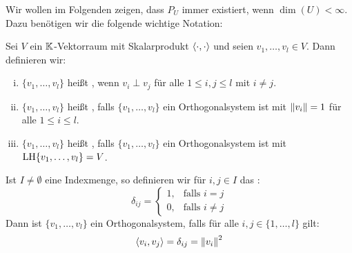 Wir wollen im Folgenden zeigen, dass $P_U$ immer existiert, wenn $\dim(U) < \infty$.
Dazu benötigen wir die folgende wichtige Notation:

\begin{definition}
	\label{def:4.5}
	Sei $V$ ein $\mathbb{K}$-Vektorraum mit Skalarprodukt $\left\langle\cdot,\cdot\right\rangle$ und seien $v_1,\dots,v_l \in V$.
	Dann definieren wir:
	
	\begin{enumerate}[(i)]
		\item $\{v_1,\dots,v_l\}$ heißt , wenn $v_i \perp v_j$ für alle $1 \leq i,j \leq l$ mit $i \neq j$.
		\item $\{v_1,\dots,v_l\}$ heißt , falls $\{v_1,\dots,v_l\}$ ein Orthogonalsystem ist mit $\left\lVert v_i\right\rVert = 1$ für alle $1 \leq i \leq l$.
		\item $\{v_1,\dots,v_l\}$ heißt , falls $\{v_1,\dots,v_l\}$ ein Orthogonalsystem ist mit $\operatorname{LH}\{v_1,\dots,v_l\} = V$.
	\end{enumerate}
\end{definition}

\begin{definition}[Kroneckersymbol]
	\label{def:4.6}
	Ist $I \neq \emptyset$ eine Indexmenge, so definieren wir für $i,j \in I$ das :
	\[
		\delta_{ij} = \begin{cases}
			1, & \text{falls } i = j \\
			0, & \text{falls } i \neq j
		\end{cases}
	\]
	Dann ist $\{v_1,\dots,v_l\}$ ein Orthogonalsystem, falls für alle $i,j \in \{1,\dots,l\}$ gilt:
	\[
		\left\langle v_i,v_j\right\rangle = \delta_{ij} = \left\lVert v_i\right\rVert^2
	\]
\end{definition}

